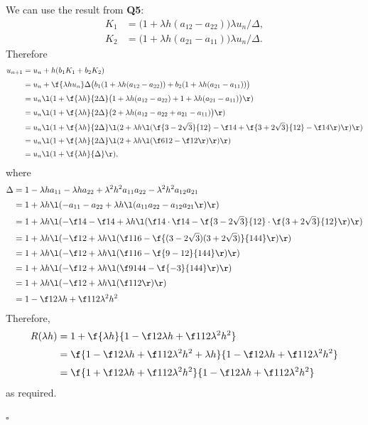 \documentclass[a4paper]{article}
\begin{document}
We can use the result from \textbf{Q5}:
\begin{align*}
K_1 &= \big( 1 + \lambda h (a_{12} - a_{22}) \big) \lambda u_n / \Delta, \\
K_2 &= \big( 1 + \lambda h (a_{21} - a_{11}) \big) \lambda u_n / \Delta.
\end{align*}
Therefore
\begin{align*}
u_{n+1} &= u_n + h (b_1 K_1 + b_2 K_2) \\[0.5ex]
&= u_n + \f{\lambda h u_n}\Delta \big( b_1 (1 + \lambda h (a_{12} - a_{22})) + b_2 (1 + \lambda h (a_{21} - a_{11})) \big) \\[0.5ex]
%
&= u_n \l( 1 + \f{\lambda h}{2\Delta} \big( 1 + \lambda h (a_{12} - a_{22}) + 1 + \lambda h (a_{21} - a_{11}) \big) \r) \\[0.5ex]
%
&= u_n \l( 1 + \f{\lambda h}{2\Delta} \big( 2 + \lambda h (a_{12} - a_{22} + a_{21} - a_{11}) \big) \r) \\[0.5ex]
%
&= u_n \l( 1 + \f{\lambda h}{2\Delta} \l( 2 + \lambda h \l( \f{3 - 2 \sqrt 3}{12} - \f14 + \f{3 + 2 \sqrt 3}{12} - \f14 \r) \r) \r) \\[0.5ex]
%
&= u_n \l( 1 + \f{\lambda h}{2\Delta} \l( 2 + \lambda h \l( \f6{12} - \f12 \r) \r) \r) \\[0.5ex]
%
&= u_n \l( 1 + \f{\lambda h}{\Delta} \r),
\end{align*}
where
\begin{align*}
\Delta &= 1 - \lambda h a_{11} - \lambda h a_{22} + \lambda^2 h^2 a_{11} a_{22} - \lambda^2 h^2 a_{12} a_{21} \\[0.5ex]
%
&= 1 + \lambda h \l( -a_{11} - a_{22} + \lambda h \l( a_{11} a_{22} - a_{12} a_{21} \r) \r) \\[0.5ex]
%
&= 1 + \lambda h \l( - \f14 - \f14 + \lambda h \l( \f14 \cdot \f14 - \f{3 - 2 \sqrt 3}{12} \cdot \f{3 + 2 \sqrt 3}{12} \r) \r) \\[0.5ex]
%
&= 1 + \lambda h \l( -\f12 + \lambda h \l( \f1{16} - \f{(3 - 2 \sqrt 3) (3 + 2 \sqrt 3)}{144} \r) \r) \\[0.5ex]
%
&= 1 + \lambda h \l( -\f12 + \lambda h \l( \f1{16} - \f{9 - 12}{144} \r) \r) \\[0.5ex]
&= 1 + \lambda h \l( -\f12 + \lambda h \l( \f9{144} - \f{-3}{144} \r) \r) \\[0.5ex]
&= 1 + \lambda h \l( -\f12 + \lambda h \l( \f1{12} \r) \r) \\[0.5ex]
&= 1 - \f12 \lambda h + \f1{12} \lambda^2 h^2
\end{align*}
Therefore,
\begin{align*}
R(\lambda h) &= 1 + \f{\lambda h}{1 - \f12 \lambda h + \f1{12} \lambda^2 h^2} \\[0.5ex]
%
&= \f{1 - \f12 \lambda h + \f1{12} \lambda^2 h^2 + \lambda h}{1 - \f12 \lambda h + \f1{12} \lambda^2 h^2} \\[0.5ex]
%
&= \f{1 + \f12 \lambda h + \f1{12} \lambda^2 h^2}{1 - \f12 \lambda h + \f1{12} \lambda^2 h^2}
\end{align*}
as required.

\hfill $\square$

\end{document}
